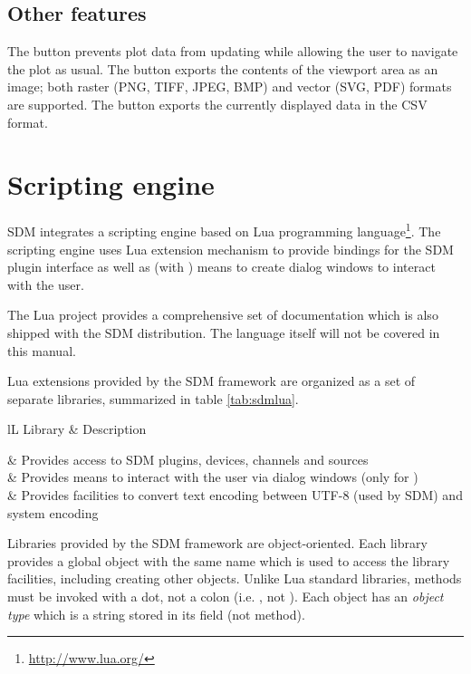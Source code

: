 \documentclass[a4paper,12pt,twoside,extrafontsizes]{memoir}
\begin{document}
\section{Other features}

The  button prevents plot data from updating while allowing the user to navigate the plot as usual. The  button exports the contents of the viewport area as an image; both raster (PNG, TIFF, JPEG, BMP) and vector (SVG, PDF) formats are supported. The  button exports the currently displayed data in the CSV format.

\chapter{Scripting engine}
\label{ch:scripting}

SDM integrates a scripting engine based on Lua programming language\footnote{\url{http://www.lua.org/}}. The scripting engine uses Lua extension mechanism to provide bindings for the SDM plugin interface as well as (with ) means to create dialog windows to interact with the user.

The Lua project provides a comprehensive set of documentation which is also shipped with the SDM distribution. The language itself will not be covered in this manual.

Lua extensions provided by the SDM framework are organized as a set of separate libraries, summarized in table \ref{tab:sdmlua}.

\begin{table}[htbp]
	\caption{Core Lua extensions provided by SDM}
	\label{tab:sdmlua}
	\begin{tabularx}{\textwidth}{lL}
		\toprule
		Library & Description \\
		\midrule

		 & Provides access to SDM plugins, devices, channels and sources \\
		 & Provides means to interact with the user via dialog windows (only for ) \\
		 & Provides facilities to convert text encoding between UTF-8 (used by SDM) and system encoding \\
		
		\bottomrule
	\end{tabularx}
\end{table}

Libraries provided by the SDM framework are object-oriented. Each library provides a global object with the same name which is used to access the library facilities, including creating other objects. Unlike Lua standard libraries, methods must be invoked with a dot, not a colon (i.e. , not ). Each object has an \emph{object type} which is a string stored in its  field (not method).
\end{document}

